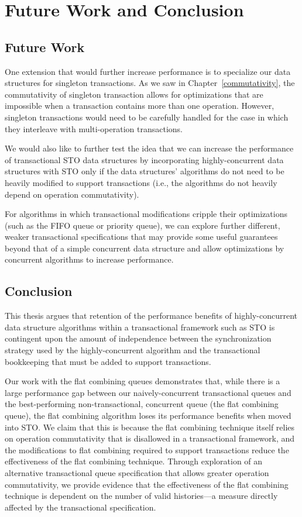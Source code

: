 \chapter{Future Work and Conclusion}

\section{Future Work}
One extension that would further increase performance is to specialize our data structures for singleton transactions. As we saw in Chapter~\ref{commutativity}, the commutativity of singleton transaction allows for optimizations that are impossible when a transaction contains more than one operation. However, singleton transactions would need to be carefully handled for the case in which they interleave with multi-operation transactions. 

We would also like to further test the idea that we can increase the performance of transactional STO data structures by incorporating highly-concurrent data structures with STO only if the data structures' algorithms do not need to be heavily modified to support transactions (i.e., the algorithms do not heavily depend on operation commutativity).

For algorithms in which transactional modifications cripple their optimizations (such as the FIFO queue or priority queue), we can explore further different, weaker transactional specifications that may provide some useful guarantees beyond that of a simple concurrent data structure and allow optimizations by concurrent algorithms to increase performance.

\section{Conclusion}
This thesis argues that retention of the performance benefits of highly-concurrent data structure algorithms within a transactional framework such as STO is contingent upon the amount of independence between the synchronization strategy used by the highly-concurrent algorithm and the transactional bookkeeping that must be added to support transactions.

Our work with the flat combining queues demonstrates that, while there is a large performance gap between our naively-concurrent transactional queues and the best-performing non-transactional, concurrent queue (the flat combining queue), the flat combining algorithm loses its performance benefits when moved into STO. We claim that this is because the flat combining technique itself relies on operation commutativity that is disallowed in a transactional framework, and the modifications to flat combining required to support transactions reduce the effectiveness of the flat combining technique. Through exploration of an alternative transactional queue specification that allows greater operation commutativity, we provide evidence that the effectiveness of the flat combining technique is dependent on the number of valid histories---a measure directly affected by the transactional specification.

